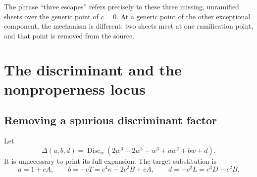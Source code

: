 \documentclass[11pt,a4paper]{article}
\theoremstyle{definition}
\newcommand{\Disc}{\operatorname{Disc}}
\newcommand{\kk}{\kappa}
\begin{document}
The phrase ``three escapes'' refers precisely to these three missing,
unramified sheets over the generic point of $c=0$. At a generic point of
the other exceptional component, the mechanism is different: two sheets
meet at one ramification point, and that point is removed from the source.

\section{The discriminant and the nonproperness locus}
\label{sec:discriminant}

\subsection{Removing a spurious discriminant factor}
Let
\begin{equation}\label{eq:universaldisc}
 \Delta(a,b,d)=\Disc_w(2w^6-2w^5-w^3+aw^2+bw+d).
\end{equation}
It is unnecessary to print its full expansion. The target substitution is
\begin{equation}\label{eq:discsub}
 a=1+cA,\qquad b=-cT=c^4\kk-2c^2B+cA,
 \qquad d=-c^2L=c^3D-c^2B.
\end{equation}
\end{document}
